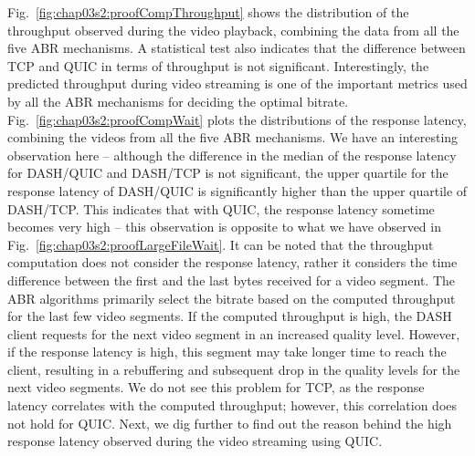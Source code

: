 Fig.~\ref{fig:chap03s2:proofCompThroughput} shows the distribution of the throughput observed during the video playback, combining the data from all the five ABR mechanisms. A statistical test also indicates that the difference between TCP and QUIC in terms of throughput is not significant. Interestingly, the predicted throughput during video streaming is one of the important metrics used by all the ABR mechanisms for deciding the optimal bitrate. Fig.~\ref{fig:chap03s2:proofCompWait} plots the distributions of the response latency, combining the videos from all the five ABR mechanisms. We have an interesting observation here -- although the difference in the median of the response latency for DASH/QUIC and DASH/TCP is not significant,  the upper quartile for the response latency of DASH/QUIC is significantly higher than the upper quartile of DASH/TCP. This indicates that with QUIC, the response latency sometime becomes very high -- this observation is opposite to what we have observed in Fig.~\ref{fig:chap03s2:proofLargeFileWait}. It can be noted that the throughput computation does not consider the response latency, rather it considers the time difference between the first and the last bytes received for a video segment. The ABR algorithms primarily select the bitrate based on the computed throughput for the last few video segments. If the computed throughput is high, the DASH client requests for the next video segment in an increased quality level. However, if the response latency is high, this segment may take longer time to reach the client, resulting in a rebuffering and subsequent drop in the quality levels for the next video segments. We do not see this problem for TCP, as the response latency correlates with the computed throughput; however, this correlation does not hold for QUIC. Next, we dig further to find out the reason behind the high response latency observed during the video streaming using QUIC.

